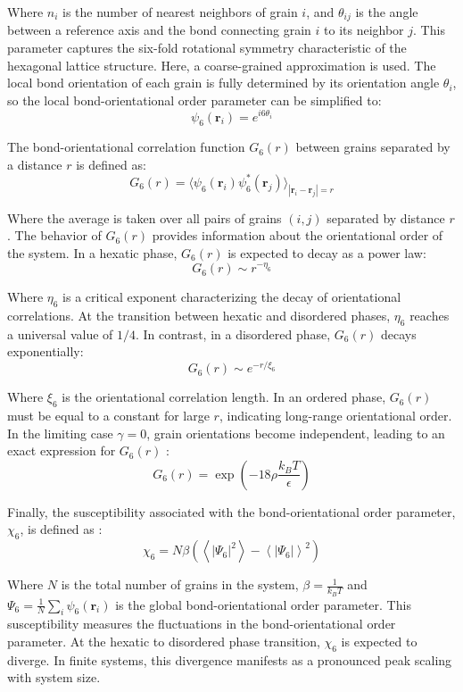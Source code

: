 Where $n_i$ is the number of nearest neighbors of grain $i$, and $\theta_{ij}$ is the angle between a reference axis and the bond connecting grain $i$ to its neighbor $j$. This parameter captures the six-fold rotational symmetry characteristic of the hexagonal lattice structure. Here, a coarse-grained approximation is used. The local bond orientation of each grain is fully determined by its orientation angle $\theta_i$, so the local bond-orientational order parameter can be simplified to:
\begin{equation}
    \psi_6(\mathbf{r}_i) = e^{i 6 \theta_i}
\end{equation}

The bond-orientational correlation function $G_6(r)$ between grains separated by a distance $r$ is defined as:
\begin{equation}
    G_6(r) = \langle \psi_6(\mathbf{r}_i) \psi_6^*(\mathbf{r}_j) \rangle_{|\mathbf{r}_i - \mathbf{r}_j| = r}
\end{equation}

Where the average is taken over all pairs of grains $(i, j)$ separated by distance $r$. The behavior of $G_6(r)$ provides information about the orientational order of the system. In a hexatic phase, $G_6(r)$ is expected to decay as a power law:
\begin{equation}
    G_6(r) \sim r^{-\eta_6}
\end{equation}

Where $\eta_6$ is a critical exponent characterizing the decay of orientational correlations. At the transition between hexatic and disordered phases, $\eta_6$ reaches a universal value of $1/4$. In contrast, in a disordered phase, $G_6(r)$ decays exponentially:
\begin{equation}
    G_6(r) \sim e^{-r/\xi_6}
\end{equation}

Where $\xi_6$ is the orientational correlation length. In an ordered phase, $G_6(r)$ must be equal to a constant for large $r$, indicating long-range orientational order. In the limiting case $\gamma = 0$, grain orientations become independent, leading to an exact expression for $G_6(r)$ \cite{Ruslan2025}:
\begin{equation}
    G_6(r) = \exp\left(- 18 \rho \frac{k_B T}{\epsilon} \right)
    \label{eq:theoricG6}
\end{equation}

Finally, the susceptibility associated with the bond-orientational order parameter, $\chi_6$, is defined as \cite{Weber1995}:
\begin{equation}
    \chi_6 = N \beta \left( \left\langle |\Psi_6|^2 \right\rangle - \left\langle |\Psi_6| \right\rangle^2 \right)
\end{equation}

Where $N$ is the total number of grains in the system, $\beta = \frac{1}{k_B T}$ and $\Psi_6 = \frac{1}{N} \sum_i \psi_6(\mathbf{r}_i)$ is the global bond-orientational order parameter. This susceptibility measures the fluctuations in the bond-orientational order parameter. At the hexatic to disordered phase transition, $\chi_6$ is expected to diverge. In finite systems, this divergence manifests as a pronounced peak scaling with system size.